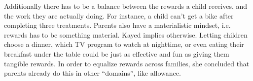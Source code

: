 Additionally there has to be a balance between the rewards a child receives, and the work they are actually doing. For instance, a child can't get a bike after completing three treatments. Parents also have a materialistic mindset, i.e. rewards has to be something material. Kayed implies otherwise. Letting children choose a dinner, which TV program to watch at nighttime, or even eating their breakfast under the table could be just as effective and fun as giving them tangible rewards. In order to equalize rewards across families, she concluded that parents already do this in other ``domains'', like allowance.   



